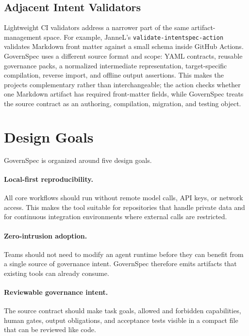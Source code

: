 \documentclass[11pt]{article}
\begin{document}
\subsection{Adjacent Intent Validators}

Lightweight CI validators address a narrower part of the same artifact-management
space. For example, JanneL's \texttt{validate-intentspec-action} validates
Markdown front matter against a small schema inside GitHub Actions. GovernSpec uses
a different source format and scope: YAML contracts, reusable governance packs, a
normalized intermediate representation, target-specific compilation, reverse import,
and offline output assertions. This makes the projects complementary rather than
interchangeable; the action checks whether one Markdown artifact has required
front-matter fields, while GovernSpec treats the source contract as an authoring,
compilation, migration, and testing object.

\section{Design Goals}

GovernSpec is organized around five design goals.

\paragraph{Local-first reproducibility.}
All core workflows should run without remote model calls, API keys, or network
access. This makes the tool suitable for repositories that handle private data and
for continuous integration environments where external calls are restricted.

\paragraph{Zero-intrusion adoption.}
Teams should not need to modify an agent runtime before they can benefit from a
single source of governance intent. GovernSpec therefore emits artifacts that
existing tools can already consume.

\paragraph{Reviewable governance intent.}
The source contract should make task goals, allowed and forbidden capabilities,
human gates, output obligations, and acceptance tests visible in a compact file that
can be reviewed like code.
\end{document}
